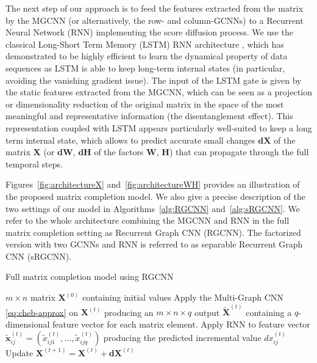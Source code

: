 \documentclass{article}
\begin{document}
The next step of our approach is to feed the features extracted from the matrix by the MGCNN (or alternatively, the row- and column-GCNNs) to a Recurrent Neural Network (RNN) implementing the score diffusion process. We use the classical Long-Short Term Memory (LSTM) RNN architecture \cite{art:HochreiterSchmidhuber97LSTM}, which has demonstrated to be highly efficient to learn the dynamical property of data sequences as LSTM is able to keep long-term internal states (in particular, avoiding the vanishing gradient issue). The input of the LSTM gate is given by the static features extracted from the MGCNN, which can be seen as a projection or dimensionality reduction of the original matrix in the space of the most meaningful and representative information (the disentanglement effect). This representation coupled with LSTM appears particularly well-suited to keep a long term internal state, which allows to predict accurate small changes $\mathbf{dX}$ of the matrix $\mathbf{X}$ (or $\mathbf{dW}$, $\mathbf{dH}$ of the factors $\mathbf{W}$, $\mathbf{H}$) that can propagate through the full temporal steps. 



Figures~\ref{fig:architectureX} and~\ref{fig:architectureWH} provides an illustration of the proposed matrix completion model. We also give a precise description of the two settings of our model in Algorithms~\ref{alg:RGCNN} and~\ref{alg:sRGCNN}. 
We refer to the whole architecture combining the MGCNN and RNN in the full matrix completion setting as Recurrent Graph CNN (RGCNN). The factorized version with two GCNNs and RNN is referred to as separable Recurrent Graph CNN (sRGCNN). 

\begin{algorithm}[!t]
\caption{Full matrix completion model using RGCNN}\label{alg:RGCNN}
\begin{algorithmic}[1]
\INPUT $m\times n$ matrix $\mathbf{X}^{(0)}$ containing initial values 
	\STATE Apply the Multi-Graph CNN \eqref{eq:cheb-approx} on $\mathbf{X}^{(t)}$ producing an $m\times n \times q$ output $\tilde{\mathbf{X}}^{(t)}$ containing a $q$-dimensional feature vector for each matrix element.
		\STATE Apply RNN to feature vector $\tilde{\mathbf{x}}^{(t)}_{ij} = (\tilde{x}^{(t)}_{ij1}, \hdots, \tilde{x}^{(t)}_{ijq})$ producing the predicted incremental value $dx^{(t)}_{ij}$
\ENDFOR
	\STATE Update $\mathbf{X}^{(t+1)} = \mathbf{X}^{(t)} + \mathbf{dX}^{(t)}$
\ENDFOR
\end{algorithmic}
\end{algorithm}
\end{document}
